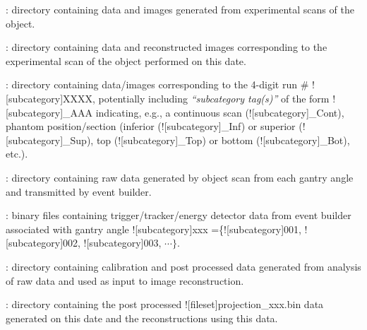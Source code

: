 \begin{tcbenvironment}
\begin{tcbenumbox}
\begin{ThinEnum}
\begin{ThinEnum}
            \item {} : directory containing data and images generated from experimental scans of the object.
            \begin{ThinEnum}
                \item {} : directory containing data and reconstructed images corresponding to the experimental scan of the object performed on this date.
                \begin{ThinEnum}
                    \item {} : directory containing data/images corresponding to the 4-digit run \# \docentry![subcategory]{XXXX}, potentially including \emph{``subcategory tag(s)''} of the form \docentry![subcategory]{\_AAA} indicating, e.g., a continuous scan (\docentry![subcategory]{\_Cont}), phantom position/section (inferior (\docentry![subcategory]{\_Inf}) or superior (\docentry![subcategory]{\_Sup}), top (\docentry![subcategory]{\_Top}) or bottom (\docentry![subcategory]{\_Bot}), etc.).
                    \begin{ThinEnum}
                        \item {} : directory containing raw data generated by object scan from each gantry angle and transmitted by event builder.
                        \begin{ThinEnum}
                            \item {} : binary files containing trigger/tracker/energy detector data from event builder associated with gantry angle \docentry![subcategory]{xxx} =\{\docentry![subcategory]{001}, \docentry![subcategory]{002}, \docentry![subcategory]{003}, $\cdots\}$.
                        \end{ThinEnum}%
                        \item {} : directory containing calibration and post processed data generated from analysis of raw data and used as input to image reconstruction.
                        \begin{ThinEnum}
                            \item {} : directory containing the post processed \docentry![fileset]{projection\_xxx.bin} data generated on this date and the reconstructions using this data.

\end{ThinEnum}
\end{ThinEnum}
\end{ThinEnum}
\end{ThinEnum}
\end{ThinEnum}
\end{ThinEnum}
\end{tcbenumbox}
\end{tcbenvironment}

